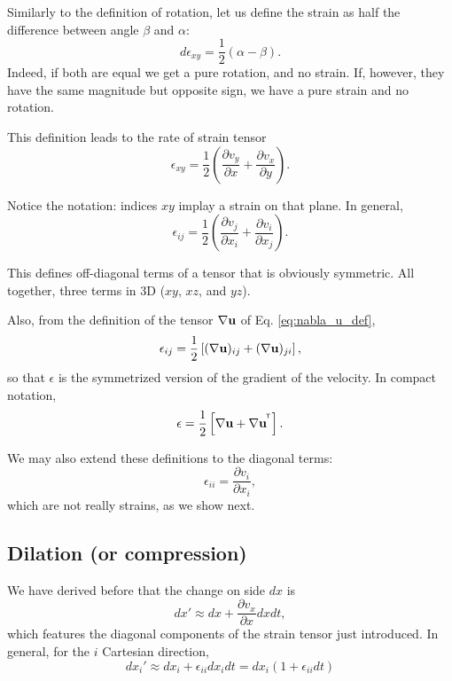 Similarly to the definition of rotation, let us define the strain as
half the difference between angle $\beta$ and $\alpha$:
\[
d\epsilon_{xy} = \frac12
\left(
        \alpha - \beta
\right) .
\]
Indeed, if both are equal we get a pure rotation, and no strain. If,
however, they have the same magnitude but opposite sign, we have a pure
strain and no rotation.

This definition leads to the rate of strain tensor
\[
\epsilon_{xy} = \frac12
\left(
  \frac{\partial v_y}{\partial x}  +
  \frac{\partial v_x}{\partial y}
\right) .
\]

Notice the notation: indices $xy$ implay a strain on that plane. In general,
\[
\epsilon_{ij} = \frac12
\left(
  \frac{\partial v_j}{\partial x_i}  +
  \frac{\partial v_i}{\partial x_j}
\right) .
\]

This defines off-diagonal terms of a tensor that is obviously
symmetric. All together, three terms in 3D ($xy$, $xz$, and $yz$).

Also, from the definition of the tensor $\nabla \mathbf{u}$ of
Eq. \ref{eq:nabla_u_def},
\begin{equation}
  \label{eq:epsilon_as_grad_u}
  \epsilon_{ij} = \frac12
  \left[
    (\nabla \mathbf{u})_{ij} +
    (\nabla \mathbf{u})_{ji}
  \right] ,
\end{equation}
so that $\epsilon$ is the symmetrized version of the gradient of the
velocity. In compact notation,
\begin{equation}
	\label{eq:epsilon_as_grad_u_compact}
	\epsilon = \frac12
	\left[
	\nabla \mathbf{u} +
	\nabla \mathbf{u}^{^{\mkern-1.5mu\mathsf{T}}}
	\right] .
\end{equation}


We may also extend these definitions to the diagonal terms:
\[
  \epsilon_{ii} =   \frac{\partial v_i}{\partial x_i} ,
\]
which are not really strains, as we show next.

\subsection{Dilation (or compression)}

We have derived before that the change on side $dx$ is
\[
dx' \approx  dx + \frac{\partial v_x}{\partial x} dx dt ,
\]
which features the diagonal components of the strain tensor just
introduced. In general, for the $i$ Cartesian direction,
\[
dx_i' \approx dx_i + \epsilon_{ii} dx_i dt = dx_i
\left(
1+\epsilon_{ii} dt
\right)
\]

